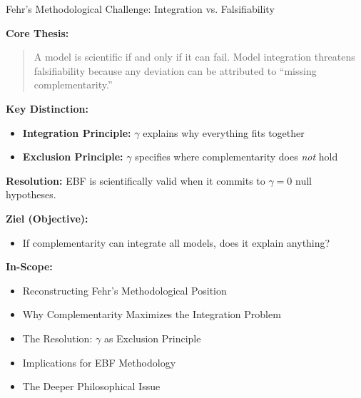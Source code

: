 \begin{chapter}{Fehr's Methodological Challenge: Integration vs. Falsifiability}
\begin{tcolorbox}[colback=yellow!5!white,colframe=yellow!75!black,title=\textbf{Quick Reference: The Fehr Position}]
\small
\textbf{Core Thesis:}
\begin{quote}
A model is scientific if and only if it can fail. Model integration threatens falsifiability because any deviation can be attributed to ``missing complementarity.''
\end{quote}

\textbf{Key Distinction:}
\begin{itemize}[noitemsep]
    \item \textbf{Integration Principle:} $\gamma$ explains why everything fits together
    \item \textbf{Exclusion Principle:} $\gamma$ specifies where complementarity does \textit{not} hold
\end{itemize}

\textbf{Resolution:} EBF is scientifically valid when it commits to $\gamma = 0$ null hypotheses.
\end{tcolorbox}



\begin{tcolorbox}[
    colback=orange!5!white,
    colframe=orange!75!black,
    title={\textbf{Appendix Scope: Ziel / In-Scope / Out-of-Scope / Constraints}},
    fonttitle=\bfseries
]

\textbf{Ziel (Objective):}
\begin{itemize}[nosep]
    \item If complementarity can integrate all models, does it explain anything?
\end{itemize}

\textbf{In-Scope:}
\begin{itemize}[nosep]
    \item Reconstructing Fehr's Methodological Position
    \item Why Complementarity Maximizes the Integration Problem
    \item The Resolution: $\gamma$ as Exclusion Principle
    \item Implications for EBF Methodology
    \item The Deeper Philosophical Issue
\end{itemize}


\end{tcolorbox}
\end{chapter}
